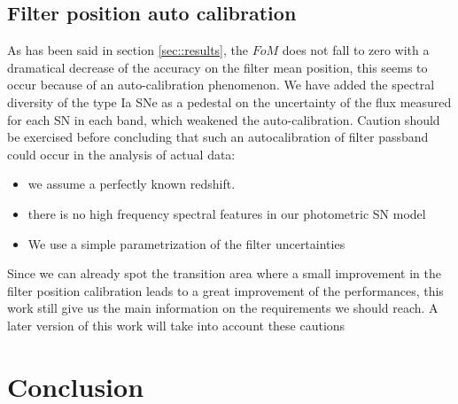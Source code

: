 \documentclass[\docopts]{\docclass}
\begin{document}
\subsection{Filter position auto calibration}
As has been said in section \ref{sec::results}, the $FoM$ does not
fall to zero with a dramatical decrease of the accuracy on the filter
mean position, this seems to occur because of an auto-calibration
phenomenon.  We have added the spectral diversity of the type Ia SNe
as a pedestal on the uncertainty of the flux measured for each SN in
each band, which weakened the auto-calibration.  Caution should be
exercised before concluding that such an autocalibration of filter
passband could occur in the analysis of actual data:
\begin{itemize}
\item we assume a perfectly known redshift.
\item there is no high frequency spectral features in our photometric SN model
\item We use a simple parametrization of the filter uncertainties
\end{itemize}
Since we can already spot the transition area where a small
improvement in the filter position calibration leads to a great
improvement of the performances, this work still give us the main
information on the requirements we should reach. A later version of
this work will take into account these cautions




\section{Conclusion}
\label{sec::conclusions}
\end{document}
